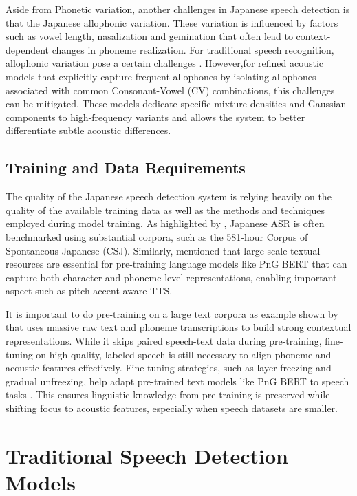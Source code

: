 Aside from Phonetic variation, another challenges in Japanese speech detection is that the Japanese allophonic variation. These variation is influenced by  factors such as vowel length, nasalization and gemination that  often lead to context-dependent changes in phoneme realization. For traditional speech recognition, allophonic variation pose a certain challenges \parencite{halpern2008role}. However,for refined acoustic models that explicitly capture frequent allophones by isolating allophones associated with common Consonant-Vowel (CV) combinations, this challenges can be mitigated. These models dedicate specific mixture densities and Gaussian components to high-frequency variants and allows the system to better differentiate subtle acoustic differences.

\subsection{Training and Data Requirements}
The quality of the Japanese speech detection system is relying heavily on the quality of the available training data as well as the methods and techniques employed during model training. As highlighted by \textcite{Karita2021} , Japanese ASR is often benchmarked using substantial corpora, such as the 581-hour Corpus of Spontaneous Japanese (CSJ). Similarly, \textcite{yasuda2022} mentioned that large-scale textual resources are essential for pre-training language models like PnG BERT that can capture both character and phoneme-level representations, enabling important aspect such as pitch-accent-aware TTS.

It is important to do pre-training on a large text corpora as example shown by \textcite{yasuda2022} that uses massive raw text and phoneme transcriptions to build strong contextual representations. While it skips paired speech-text data during pre-training, fine-tuning on high-quality, labeled speech is still necessary to align phoneme and acoustic features effectively. Fine-tuning strategies, such as layer freezing and gradual unfreezing, help adapt pre-trained text models like PnG BERT to speech tasks \parencite{ardestani2024study}. This ensures linguistic knowledge from pre-training is preserved while shifting focus to acoustic features, especially when speech datasets are smaller. 


\section{Traditional Speech Detection Models } 
